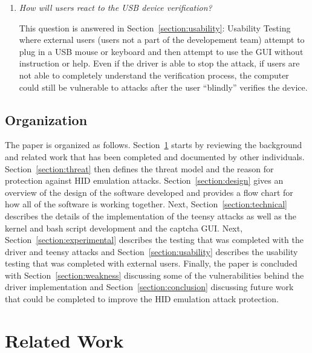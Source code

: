 \documentclass[pagenumbers]{ieee}
\begin{document}
\begin{enumerate}
\item \textit{How will users react to the USB device verification?}

This question is answered in Section~\ref{section:usability}: Usability Testing where external users (users not a part of the developement team) attempt to plug in a USB mouse or keyboard and then attempt to use the GUI without instruction or help. Even if the driver is able to stop the attack, if users are not able to completely understand the verification process, the computer could still be vulnerable to attacks after the user ``blindly'' verifies the device.

\end{enumerate}


\subsection{Organization}
\label{section:organization}

The paper is organized as follows. Section~\ref{section:related} starts by reviewing the background and related work that has been completed and documented by other individuals. Section~\ref{section:threat} then defines the threat model and the reason for protection against HID emulation attacks. Section~\ref{section:design} gives an overview of the design of the software developed and provides a flow chart for how all of the software is working together. Next, Section~\ref{section:technical} describes the details of the implementation of the teensy attacks as well as the kernel and bash script development and the captcha GUI. Next, Section~\ref{section:experimental} describes the testing that was completed with the driver and teensy attacks and Section~\ref{section:usability} describes the usability testing that was completed with external users. Finally, the paper is concluded with Section~\ref{section:weakness} discussing some of the vulnerabilities behind the driver implementation and Section~\ref{section:conclusion} discussing future work that could be completed to improve the HID emulation attack protection.


\section{Related Work}
\label{section:related}
\end{document}
